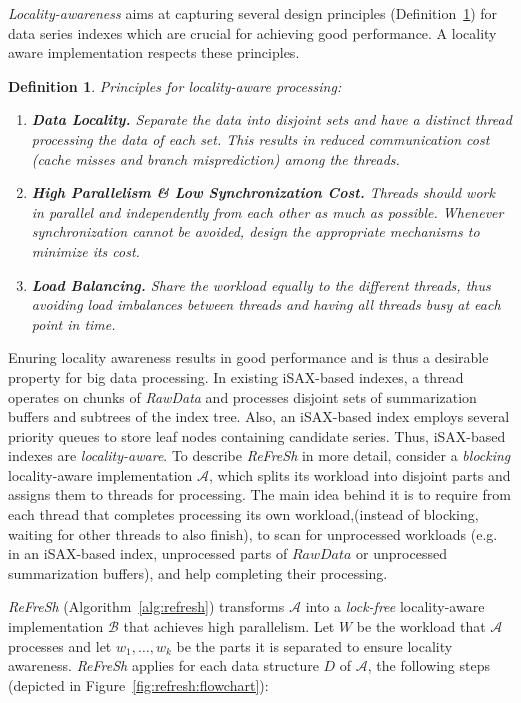 \documentclass[a4paper,11pt,twoside,openany]{book}
\newtheorem{definition}{Definition}
\begin{document}
{\em Locality-awareness}  aims at capturing several design principles (Definition~\ref{def:principles})
for data series indexes which are crucial for achieving good performance.
A locality aware implementation respects these principles. 
% 
\begin{definition}
\label{def:principles}
Principles for {\em locality-aware} processing:
\begin{enumerate}
\item
{\bf Data Locality.} Separate the data into {\em disjoint sets} and have a distinct thread
processing the data of each set. This results in reduced communication 
cost (cache misses and branch misprediction) among the threads.
\item
{\bf High Parallelism \& Low Synchronization Cost.} 
Threads should work in parallel and independently from each other as much as possible. 
Whenever synchronization cannot be avoided, design the appropriate 
mechanisms to minimize its cost.
\item
{\bf Load Balancing.} Share the workload equally to the different threads, thus
avoiding load imbalances between threads and having all threads busy at each
point in time. 

\end{enumerate}
\end{definition}
% 
Enuring locality awareness results in good performance and is thus 
a desirable property for big data processing. In existing iSAX-based indexes, 
a thread operates on chunks of \textit{RawData} and processes disjoint sets of summarization
buffers and subtrees of the index tree. Also, an iSAX-based index employs 
several priority queues to store leaf nodes containing candidate series.
Thus, iSAX-based indexes are {\em locality-aware}.
% 
To describe \textit{ReFreSh} in more detail, consider a {\em blocking} locality-aware
implementation $\mathcal{A}$, which splits its workload into disjoint parts and assigns them to 
threads for processing. 
% 
The main idea behind it is to require from each thread that completes processing
its own workload,(instead of blocking, waiting for other threads to also finish), 
to scan for unprocessed workloads (e.g. in an iSAX-based index, unprocessed parts of $RawData$
or unprocessed summarization buffers), and help completing their processing. 

\textit{ReFreSh} (Algorithm~\ref{alg:refresh}) transforms $\mathcal{A}$ into a {\em lock-free} 
locality-aware implementation $\mathcal{B}$ that achieves high parallelism. 
% 
Let $W$ be the workload that $\mathcal{A}$ processes 
and let $w_1, \ldots, w_k$ be the parts it is separated to ensure locality awareness.
\textit{ReFreSh} applies for each data structure $D$ of $\mathcal{A}$, 
the following steps (depicted in Figure~\ref{fig:refresh:flowchart}):
\end{document}
